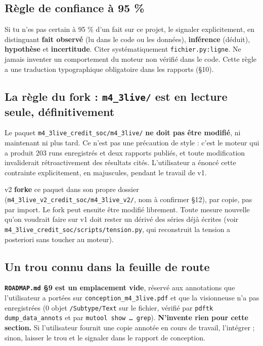 \documentclass[11pt,a4paper]{article}
\newcommand{\code}[1]{\texttt{#1}}
\begin{document}
\subsection*{Règle de confiance à 95 \%}

Si tu n'es pas certain à 95 \% d'un fait sur ce projet, le signaler explicitement, en distinguant \textbf{fait observé} (lu dans le code ou les données), \textbf{inférence} (déduit), \textbf{hypothèse} et \textbf{incertitude}. Citer systématiquement \code{fichier.py:ligne}. Ne jamais inventer un comportement du moteur non vérifié dans le code. Cette règle a une traduction typographique obligatoire dans les rapports (§10).

\subsection*{La règle du fork : \code{m4\_3live/} est en lecture seule, définitivement}

Le paquet \code{m4\_3live\_credit\_soc/m4\_3live/} \textbf{ne doit pas être modifié}, ni maintenant ni plus tard. Ce n'est pas une précaution de style : c'est le moteur qui a produit 203 runs enregistrés et deux rapports publiés, et toute modification invaliderait rétroactivement des résultats cités. L'utilisateur a énoncé cette contrainte explicitement, en majuscules, pendant le travail de v1.

v2 \textbf{forke} ce paquet dans son propre dossier (\code{m4\_3live\_v2\_credit\_soc/m4\_3live\_v2/}, nom à confirmer §12), par copie, pas par import. Le fork peut ensuite être modifié librement. Toute mesure nouvelle qu'on voudrait faire sur v1 doit rester un dérivé des séries déjà écrites (voir \code{m4\_3live\_credit\_soc/scripts/tension.py}, qui reconstruit la tension a posteriori sans toucher au moteur).

\subsection*{Un trou connu dans la feuille de route}

\textbf{\code{ROADMAP.md} §9 est un emplacement vide}, réservé aux annotations que l'utilisateur a portées sur \code{conception\_m4\_3live.pdf} et que la visionneuse n'a pas enregistrées (0 objet \code{/Subtype/Text} sur le fichier, vérifié par \code{pdftk dump\_data\_annots} et par \code{mutool show \dots{} grep}). \textbf{N'invente rien pour cette section.} Si l'utilisateur fournit une copie annotée en cours de travail, l'intégrer ; sinon, laisser le trou et le signaler dans le rapport de conception.
\end{document}
